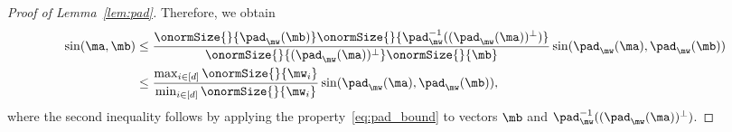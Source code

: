 \documentclass[lettersize,onecolumn,journal]{IEEEtran}
\theoremstyle{definition}
\newtheorem{lem}{Lemma}
\newtheorem{cor}{Corollary}
\theoremstyle{definition}
\begin{document}
\begin{proof}[Proof of Lemma~\ref{lem:pad}]
Therefore, we obtain 
\begin{align}
    \sin(\ma, \mb) &\leq \frac{ \onormSize{}{\pad_{\mw}(\mb) } \onormSize{}{\pad_{\mw}^{-1}((\pad_{\mw}(\ma))^{\perp})  } }{ \onormSize{}{(\pad_{\mw}(\ma))^{\perp} } \onormSize{}{\mb} }  \sin(\pad_{\mw}(\ma), \pad_{\mw}(\mb))\\
    & \leq \frac{ \max_{i \in [d]} \onormSize{}{\mw_i} }{\min_{i \in [d]} \onormSize{}{\mw_i}} \sin(\pad_{\mw}(\ma), \pad_{\mw}(\mb)),
\end{align}
where the second inequality follows by applying the property~\eqref{eq:pad_bound} to vectors $\mb$ and $\pad_{\mw}^{-1}((\pad_{\mw}(\ma))^{\perp})$.
\end{proof}





\end{document}
